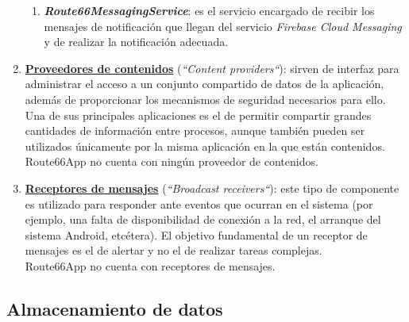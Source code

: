 \documentclass[twoside]{report}
\begin{document}
\begin{enumerate}
\begin{enumerate}
	\item \textbf{\textit{Route66MessagingService}}: es el servicio encargado de recibir los mensajes de notificación que llegan del servicio \textit{Firebase Cloud Messaging} y de realizar la notificación adecuada.
	\end{enumerate}

\item \textbf{\underline{Proveedores de contenidos}} (\textit{“Content providers“}): sirven de interfaz para administrar el acceso a un conjunto compartido de datos de la aplicación, además de proporcionar los mecanismos de seguridad necesarios para ello. Una de sus principales aplicaciones es el de permitir compartir grandes cantidades de información entre procesos, aunque también pueden ser utilizados únicamente por la misma aplicación en la que están contenidos.\\
Route66App no cuenta con ningún proveedor de contenidos.

\item \textbf{\underline{Receptores de mensajes}} (\textit{“Broadcast receivers“}): este tipo de componente es utilizado para responder ante eventos que ocurran en el sistema (por ejemplo, una falta de disponibilidad de conexión a la red, el arranque del sistema Android, etcétera). El objetivo fundamental de un receptor de mensajes es el de alertar y no el de realizar tareas complejas. \\
Route66App no cuenta con receptores de mensajes.
\end{enumerate}

\subsection{Almacenamiento de datos}
\end{document}
